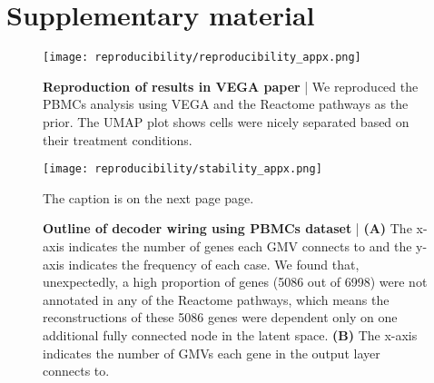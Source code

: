 \chapter{Supplementary material}
\begin{figure}[h!]
    \centering
    \texttt{[image: reproducibility/reproducibility\_appx.png]}
    \caption{\small{\textbf{Reproduction of results in VEGA paper} | We reproduced the PBMCs analysis using VEGA and the Reactome pathways as the prior. The UMAP plot shows cells were nicely separated based on their treatment conditions.}}
    \label{fig:reproducibility_appx}
\end{figure}

\begin{figure}[h!]
    \centering
    \texttt{[image: reproducibility/stability\_appx.png]}
    \caption{\small{The caption is on the next page page.}}
    \label{fig:stability_appx}
\end{figure}

\addtocounter{figure}{-1}
\begin{figure}[t!]
    \caption{\small{\textbf{Outline of decoder wiring using PBMCs dataset} | \textbf{(A)} The x-axis indicates the number of genes each GMV connects to and the y-axis indicates the frequency of each case. We found that, unexpectedly, a high proportion of genes (5086 out of 6998) were not annotated in any of the Reactome pathways, which means the reconstructions of these 5086 genes were dependent only on one additional fully connected node in the latent space. \textbf{(B)} The x-axis indicates the number of GMVs each gene in the output layer connects to.}}
\end{figure}

